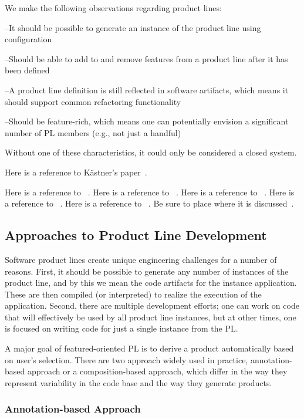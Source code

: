 \documentclass[sigconf]{acmart}
\begin{document}
We make the following observations regarding product lines:

--It should be possible to generate an instance of the product line using configuration

--Should be able to add to and remove features from a product line after it has been defined

--A product line definition is still reflected in software artifacts, which means it should support common refactoring functionality

--Should be feature-rich, which means one can potentially envision a significant number of PL members (e.g., not just a handful)

Without one of these characteristics, it could only be considered a closed system.

Here is a reference to K\"{a}stner's paper~\cite{Kastner:2012}.

Here is a reference to ~\cite{leich2005tool}.
Here is a reference to ~\cite{Thum:2014:FEF:2537169.2537315}.
Here is a reference to ~\cite{proksch2014tool}.
Here is a reference to ~\cite{7203038}.
Here is a reference to ~\cite{Sayre:2005:UMA:1082983.1083277}.
Be sure to place where it is discussed~\cite{CIDE:Eclipse}.

\subsection{Approaches to Product Line Development}

Software product lines create unique engineering challenges for a number of reasons. First, it should be
possible to generate any number of  instances of the product line, and by this we mean the code artifacts
for the instance application. These are then compiled (or interpreted) to realize the execution of the
application. Second, there are multiple development efforts; one can work on code that will effectively be
used by all product line instances, but at other times, one is focused on writing code for just a single
instance from the PL.

A major goal of featured-oriented PL is to derive a product automatically based on user’s selection. There are
two approach widely used in practice,  annotation-based approach or a composition-based approach, which differ in
the way they represent variability in the code base and the way they generate products.


\subsubsection{Annotation-based Approach}
\end{document}

